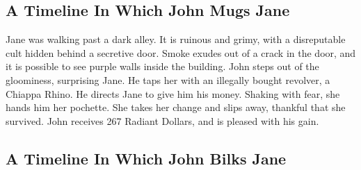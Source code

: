 \documentclass{article}
\begin{document}
\subsection{A Timeline In Which John Mugs Jane}


Jane was walking past a dark alley.
It is ruinous and grimy, with a disreputable cult hidden behind a secretive door.
Smoke exudes out of a crack in the door, and it is possible to see purple walls inside the building.
John steps out of the gloominess, surprising Jane.
He taps her with an illegally bought revolver, a Chiappa Rhino.
He directs Jane to give him his money.
Shaking with fear, she hands him her pochette.
She takes her change and slips away, thankful that she survived.
John receives 267 Radiant Dollars, and is pleased with his gain.
\subsection{A Timeline In Which John Bilks Jane}
\end{document}
